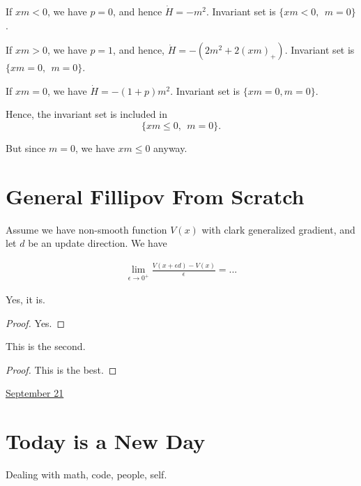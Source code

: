 \documentclass[letterpaper,11pt]{article}
\begin{document}
If $xm <0$, we have $p=0$, and hence $\dot H = - m^2$. 
Invariant set is $\{xm < 0, ~~ m=0\}$.

If $xm >0$, we have $p = 1$, and hence, $\dot H = -(2 m^2 + 2 (xm)_+)$. Invariant set is $\{xm=0, ~~ m=0\}.$

If $xm=0$, we have $\dot H = -(1+p) m^2$. Invariant set is $\{xm=0, m = 0\}$. 

Hence, the invariant set is included in 
$$
\{xm \leq 0, ~~ m = 0\}. 
$$

But since $m=0$, we have $xm\leq 0$ anyway. 


\section{General Fillipov From Scratch}

\begin{ctheorem}
Assume we have non-smooth function $V(x)$ with clark generalized gradient, and let $d$ be an update direction. We have 
\end{ctheorem} 
\begin{cproof} 
\begin{align*}
\lim_{\epsilon \to 0^+}\frac{V(x + \epsilon d) - V(x)}{\epsilon} 
= ... 
\end{align*}  
\end{cproof}   

\begin{thm}
    Yes, it is. 
\end{thm}
\begin{proof} 
    Yes. 
\end{proof}    

\begin{theorem}
    This is the second. 
\end{theorem}
\begin{proof}
    This is the best. 
\end{proof}     





\clearpage


\href{run:2025-09-21.tex}{\Huge September 21} 

\section{Today is a New Day}

Dealing with math, code, people, self. 



\clearpage




\end{document}

